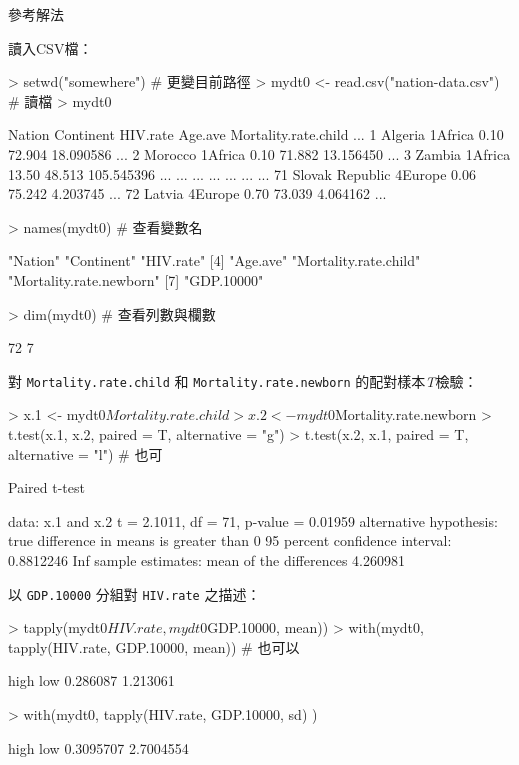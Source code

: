 \documentclass[12pt, aspectratio=43]{beamer}
\begin{document}
\begin{frame}{參考解法}

讀入CSV檔：
\begin{RC}
> setwd("somewhere") # 更變目前路徑
> mydt0 <- read.csv("nation-data.csv")  # 讀檔
> mydt0
\end{RC}
\begin{R}
                Nation Continent HIV.rate Age.ave Mortality.rate.child ...
1              Algeria   1Africa     0.10  72.904            18.090586 ...
2              Morocco   1Africa     0.10  71.882            13.156450 ...
3               Zambia   1Africa    13.50  48.513           105.545396 ...
                   ...       ...      ...     ...                 ...  ...
71     Slovak Republic   4Europe     0.06  75.242             4.203745 ...
72              Latvia   4Europe     0.70  73.039             4.064162 ...
\end{R}
\begin{RC}
> names(mydt0)  # 查看變數名
\end{RC}
\begin{R}
[1] "Nation"                 "Continent"              "HIV.rate"              
[4] "Age.ave"                "Mortality.rate.child"   "Mortality.rate.newborn"
[7] "GDP.10000" 
\end{R}
\begin{RC}
> dim(mydt0)   # 查看列數與欄數
\end{RC}
\begin{R}
[1] 72  7
\end{R}
\framebreak 

對 \verb+Mortality.rate.child+ 和 \verb+Mortality.rate.newborn+ 的配對樣本\emph{T}檢驗：
\begin{RC}
> x.1 <- mydt0$Mortality.rate.child
> x.2 <- mydt0$Mortality.rate.newborn
> t.test(x.1, x.2, paired = T, alternative = "g")
> t.test(x.2, x.1, paired = T, alternative = "l") # 也可
\end{RC}

\begin{R}
	Paired t-test

data:  x.1 and x.2
t = 2.1011, df = 71, p-value = 0.01959
alternative hypothesis: true difference in means is greater than 0
95 percent confidence interval:
 0.8812246       Inf
sample estimates:
mean of the differences 
               4.260981
\end{R}

\framebreak 

以 \verb+GDP.10000+ 分組對 \verb+HIV.rate+ 之描述：
\begin{RC}
> tapply(mydt0$HIV.rate, mydt0$GDP.10000, mean))
> with(mydt0, {tapply(HIV.rate, GDP.10000, mean)})  # 也可以
\end{RC}
\begin{R}
    high      low 
0.286087 1.213061 
\end{R}
\begin{RC}
> with(mydt0, {tapply(HIV.rate, GDP.10000, sd)} )
\end{RC}
\begin{R}
     high       low 
0.3095707 2.7004554 
\end{R}


\end{frame}
\end{document}
